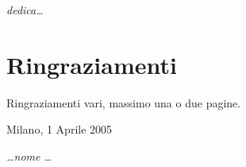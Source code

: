 \thispagestyle{empty}

\begin{flushright}
\Large\textit{dedica\dots}
\end{flushright}


\cleardoublepage

\thispagestyle{empty}

\chapter*{Ringraziamenti}
Ringraziamenti vari, massimo una o due pagine.

\begin{flushleft}
Milano, 1 Aprile 2005
\end{flushleft}

\begin{flushright}
\emph{\dots nome \dots}
\end{flushright}

\cleardoublepage
\thispagestyle{empty}